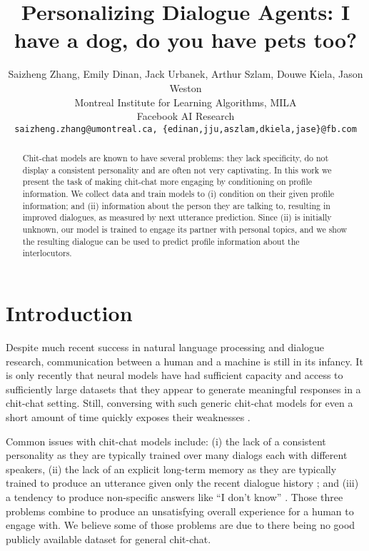 \documentclass[11pt,a4paper]{article}
\title{Personalizing Dialogue Agents: I have a dog, do you have pets too?}
\author{Saizheng Zhang, Emily Dinan, Jack Urbanek, Arthur Szlam, Douwe Kiela, Jason Weston\\
    Montreal Institute for Learning Algorithms, MILA\\ Facebook AI Research\\
  {\tt saizheng.zhang@umontreal.ca, \{edinan,jju,aszlam,dkiela,jase\}@fb.com}}
\date{}
\begin{document}
\maketitle
\addtocounter{footnote}{1}
\begin{abstract}
Chit-chat models are known to have several problems: they lack specificity, do not display a consistent personality and are often not very captivating.
In this work we present the task of
 making chit-chat more engaging by conditioning on 
 profile information.
We collect data and train models to (i) condition on
their given profile information; and (ii) information about the person they are talking to,
resulting in improved dialogues, as measured by next utterance prediction.
Since (ii) is initially unknown,
our model is trained to engage its partner with personal topics, and we show the resulting dialogue can be used to predict profile information about the interlocutors.
\end{abstract}

\newif\ifarxiv
\arxivfalse



\newif\ifnoarxiv
\noarxivtrue


\section{Introduction}

Despite much recent success in natural language processing and dialogue research, communication between a human and a machine is still in its infancy.
It is only recently that neural models have had sufficient capacity and access to sufficiently large datasets that they appear to generate meaningful responses in a chit-chat setting. Still, conversing with such generic chit-chat models for even a short amount of 
time quickly exposes their weaknesses \citep{serban2016generative,vinyals2015neural}.


Common issues with chit-chat models  
include:
(i) the lack of a consistent personality \citep{li2016persona} as they are typically trained over many dialogs each with different speakers,  (ii)
the lack of an explicit long-term memory as they are typically trained to produce an utterance given only the recent dialogue history \citep{vinyals2015neural}; and  (iii)
a tendency to produce non-specific answers like ``I don't know'' \citep{li2015diversity}. 
Those three problems combine to produce an unsatisfying overall experience for a human to engage with. We believe some of those problems are due to there being no good publicly available dataset for general chit-chat. 
\ifarxiv
\footnote{For example,  currently the  most general chit-chat dataset available in \url{http://parl.ai} a large repository of dialogue datasets is probably OpenSubtitles, which is based on movie scripts, not natural conversations.}.
\fi
\end{document}
